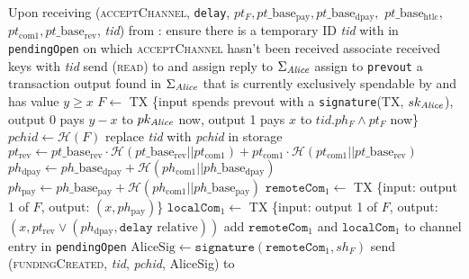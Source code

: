 \begin{algorithmic}[1]
    \State Upon receiving (\textsc{acceptChannel}, \texttt{delay}, $pt_F,
    pt\_\mathrm{base}_{\mathrm{pay}}, pt\_\mathrm{base}_{\mathrm{dpay}},$
    $pt\_\mathrm{base}_{\mathrm{htlc}},$ $pt_{\mathrm{com}1},
    pt\_\mathrm{base}_{\mathrm{rev}}$, \textit{tid}) from \bob:
    \Indent
      \State ensure there is a temporary ID \textit{tid} with \bob{} in
      \texttt{pendingOpen} on which \textsc{acceptChannel} hasn't been received
      \State associate received keys with \textit{tid}
      \State send (\textsc{read}) to \ledger{} and assign reply to
      $\Sigma_{\mathit{Alice}}$
      \State assign to \texttt{prevout} a transaction output found in
      $\Sigma_{\mathit{Alice}}$ that is currently exclusively spendable by \alice{} and
      has value $y \geq x$
      \State $F \gets$ TX \{input spends prevout with a \texttt{signature}(TX,
      $sk_{\mathit{Alice}}$), output 0 pays $y - x$ to $pk_{\mathit{Alice}}$ now, output 1 pays
      $x$ to $\textit{tid}.ph_F \wedge pt_F$ now\}
      \State $\mathit{pchid} \gets \mathcal{H}\left(F\right)$
      \State replace \textit{tid} with \textit{pchid} in storage
      \State $pt_{\mathrm{rev}} \gets pt\_\mathrm{base}_{\mathrm{rev}} \cdot
      \mathcal{H}\left(pt\_\mathrm{base}_{\mathrm{rev}} ||
      pt_{\mathrm{com}1}\right) + pt_{\mathrm{com}1} \cdot \mathcal{H}\left(
      pt_{\mathrm{com}1} || pt\_\mathrm{base}_{\mathrm{rev}}\right)$
      \State $ph_{\mathrm{dpay}} \gets ph\_\mathrm{base}_{\mathrm{dpay}} +
      \mathcal{H}\left(ph_{\mathrm{com}1} ||
      ph\_\mathrm{base}_{\mathrm{dpay}}\right)$
      \State $ph_{\mathrm{pay}} \gets ph\_\mathrm{base}_{\mathrm{pay}} +
      \mathcal{H}\left(ph_{\mathrm{com}1} ||
      ph\_\mathrm{base}_{\mathrm{pay}}\right)$
      \State $\mathtt{remoteCom}_1 \gets$ TX \{input: output 1 of $F$, output:
      $\left(x, ph_{\mathrm{pay}}\right)$\}
      \State $\mathtt{localCom}_1 \gets$ TX \{input: output 1 of $F$, output:
      $\left(x, pt_{\mathrm{rev}} \vee \left(ph_{\mathrm{dpay}}, \mathtt{delay}
      \text{ relative}\right)\right)$ 
      \State add $\mathtt{remoteCom}_1$ and $\mathtt{localCom}_1$ to channel
      entry in \texttt{pendingOpen}
      \State $\mathrm{AliceSig} \gets
      \mathtt{signature}\left(\mathtt{remoteCom}_1, sh_F\right)$
      \State send (\textsc{fundingCreated}, \textit{tid},
      \textit{pchid}, AliceSig) to \bob
    \EndIndent
    \State


\end{algorithmic}
